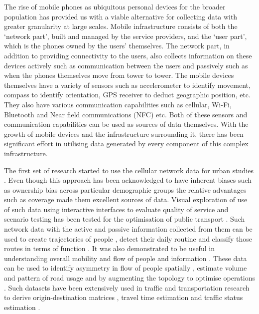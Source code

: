 The rise of mobile phones as ubiquitous personal devices for the broader population has provided us with a viable alternative for collecting data with greater granularity at large scales.
Mobile infrastructure consists of both the `network part’, built and managed by the service providers, and the `user part’, which is the phones owned by the users’ themselves.
The network part, in addition to providing connectivity to the users, also collects information on these devices actively such as communication between the users and passively such as when the phones themselves move from tower to tower.
The mobile devices themselves have a variety of sensors such as accelerometer to identify movement, compass to identify orientation, GPS receiver to deduct geographic position, etc.
They also have various communication capabilities such as cellular, Wi-Fi, Bluetooth and Near field communications (NFC) etc. 
Both of these sensors and communication capabilities can be used as sources of data themselves.
With the growth of mobile devices and the infrastructure surrounding it, there has been significant effort in utilising data generated by every component of this complex infrastructure.

The first set of research started to use the cellular network data for urban studies \citep{jiang2013,steenbruggen2015, lokanathan2015, calabrese2015, reades2007}.
Even though this approach has been acknowledged to have inherent biases such as ownership bias across particular demographic groups \citep{wesolowski2013} the relative advantages such as coverage made them excellent sources of data.
Visual exploration of use of such data using interactive interfaces to evaluate quality of service and scenario testing has been tested for the optimisation of public transport \citep{sbodio2014}.
Such network data with the active and passive information collected from them can be used to create trajectories of people \cite{schlaich2010}, detect their daily routine \citep{sevtsuk2010} and classify those routes in terms of function \citep{becker2011a}.
It was also demonstrated to be useful in understanding overall mobility and flow of people and information \citep{candia2008, krings2009, simini2012, zhang2019}.
These data can be used to identify asymmetry in flow of people spatially \citep{phithakkitnukoon2011}, estimate volume and pattern of road usage \citep{bolla2000, wang2012} and by augmenting the topology to optimise operations \citep{puzis2013}.
Such datasets have been extensively used in traffic and transportation research to derive origin-destination matrices \citep{caceres2007, mellegard2011, iqbal2014}, travel time estimation \citep{janecek2012} and traffic status estimation \citep{demissie2013, grauwin2015}. 

